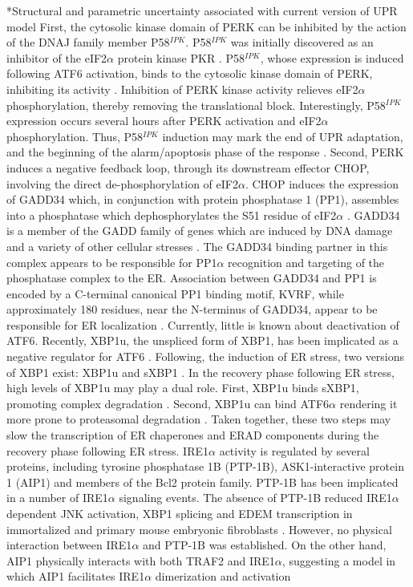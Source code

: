 \documentclass[12pt]{article}
\makeatletter
\renewcommand\section{\@startsection
	{subsection}{2}{0mm}
	{-0.2in}
	{0.05\baselineskip}
	{\normalfont\normalsize\bfseries}}
\makeatother
\begin{document}
\section*{Structural and parametric uncertainty associated with current version of UPR model}
First, the cytosolic kinase domain of PERK can be inhibited by the action of the DNAJ family member P58$^{IPK}$. P58$^{IPK}$ was initially discovered as an inhibitor of the eIF2$\alpha$ protein kinase PKR \cite{Lee:1990ye}. P58$^{IPK}$, whose expression is induced following ATF6 activation, binds to the cytosolic kinase domain of PERK, inhibiting its activity \cite{Yan:2002fk,Huizen:2003qo}. Inhibition of PERK kinase activity relieves eIF2$\alpha$ phosphorylation, thereby removing the translational block. Interestingly, P58$^{IPK}$ expression occurs several hours after PERK activation and eIF2$\alpha$ phosphorylation. Thus, P58$^{IPK}$ induction may mark the end of UPR adaptation, and the beginning of the alarm/apoptosis phase of the response \cite{szegezdi2006mediators}. Second, PERK induces a negative feedback loop, through its downstream effector CHOP, involving the direct de-phosphorylation of eIF2$\alpha$. CHOP induces the expression of GADD34 which, in conjunction with protein phosphatase 1 (PP1), assembles into a phosphatase which dephosphorylates the S51 residue of eIF2$\alpha$ \cite{Novoa:2001mb}. GADD34 is a member of the GADD family of genes which are induced by DNA damage and a variety of other cellular stresses \cite{Zhan:1994cq}. The GADD34 binding partner in this complex appears to be responsible for PP1$\alpha$ recognition and targeting of the phosphatase complex to the ER. Association between GADD34 and PP1 is encoded by a C-terminal canonical PP1 binding motif, KVRF, while approximately 180 residues, near the N-terminus of GADD34, appear to be responsible for ER localization \cite{Brush:2003kh}. Currently, little is known about deactivation of ATF6. Recently, XBP1u, the unspliced form of XBP1, has been implicated as a negative regulator for ATF6 \cite{Yoshida:2009bs}. Following, the induction of ER stress, two versions of XBP1 exist: XBP1u and sXBP1 \cite{Yoshida:2009bs}. In the recovery phase following ER stress, high levels of XBP1u may play a dual role. First, XBP1u binds sXBP1, promoting complex degradation \cite{Yoshida:2006dz, Tirosh:2006fv}. Second, XBP1u can bind ATF6$\alpha$ rendering it more prone to proteasomal degradation \cite{Yoshida:2009bs}. Taken together, these two steps may slow the transcription of ER chaperones and ERAD components during the recovery phase following ER stress. IRE1$\alpha$ activity is regulated by several proteins, including tyrosine phosphatase 1B (PTP-1B), ASK1-interactive protein 1 (AIP1) and members of the Bcl2 protein family. PTP-1B has been implicated in a number of IRE1$\alpha$ signaling events. The absence of PTP-1B reduced IRE1$\alpha$ dependent JNK activation, XBP1 splicing and EDEM transcription in immortalized and primary mouse embryonic fibroblasts \cite{Gu:2004kx}. However, no physical interaction between IRE1$\alpha$ and PTP-1B was established. On the other hand, AIP1 physically interacts with both TRAF2 and IRE1$\alpha$, suggesting a model in which AIP1 facilitates IRE1$\alpha$ dimerization and activation 
\end{document}
